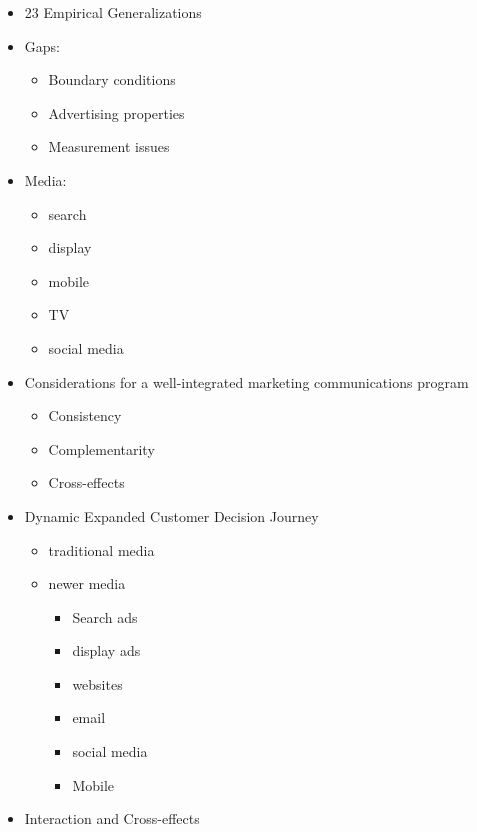 \documentclass[
]{book}
\begin{document}
\citep{wind2009}

\begin{itemize}
\item
  23 Empirical Generalizations
\item
  Gaps:

  \begin{itemize}
  \item
    Boundary conditions
  \item
    Advertising properties
  \item
    Measurement issues
  \end{itemize}
\end{itemize}

\citep{batra2016}

\begin{itemize}
\item
  Media:

  \begin{itemize}
  \item
    search
  \item
    display
  \item
    mobile
  \item
    TV
  \item
    social media
  \end{itemize}
\item
  Considerations for a well-integrated marketing communications program

  \begin{itemize}
  \item
    Consistency
  \item
    Complementarity
  \item
    Cross-effects
  \end{itemize}
\item
  Dynamic Expanded Customer Decision Journey

  \begin{itemize}
  \item
    traditional media
  \item
    newer media

    \begin{itemize}
    \item
      Search ads
    \item
      display ads
    \item
      websites
    \item
      email
    \item
      social media
    \item
      Mobile
    \end{itemize}
  \end{itemize}
\item
  Interaction and Cross-effects


\end{itemize}
\end{document}
